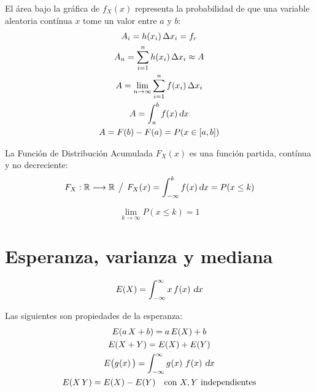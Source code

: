 El área bajo la gráfica de $f_X(x)$ representa la probabilidad de que una variable aleatoria contínua $x$ tome un valor entre $a$ y $b$:
\begin{gather*}
    A_i = h(x_i) \, \Delta x_i = f_r
    \\
    A_n = \sum_{i=1}^n h(x_i) \, \Delta x_i \approx A
    \\
    A = \lim_{n \to \infty} \sum_{i=1}^n f(x_i) \, \Delta x_i
    \\
    A = \int_a^b f(x) \, \dif x
    \\
    A = F(b) - F(a) = P(x \in [a,b])
\end{gather*}

La Función de Distribución Acumulada $F_X(x)$ es una función partida, contínua y no decreciente:
\begin{equation*}
    F_X: \setR \longrightarrow \setR \tq F_X(x) = \int_{-\infty}^k f(x) \, \dif x = P(x \leq k)
\end{equation*}

\begin{mdframed}[style=PropertyFrame]
    \begin{prop}
    \end{prop}
    \begin{equation*}
        \lim_{k \to \infty} P(x \leq k)=1
    \end{equation*}
\end{mdframed}


\section{Esperanza, varianza y mediana}

\begin{mdframed}[style=DefinitionFrame]
    \begin{defn}
    \end{defn}
    \begin{equation*}
        E(X) = \int_{-\infty}^{\infty} x \, \fx{x} \, \dif x
    \end{equation*}
\end{mdframed}

Las siguientes son propiedades de la esperanza:
\begin{gather*}
    E(a \, X + b) = a \, E(X) + b
    \\
    E(X+Y) = E(X) + E(Y)
    \\
    E \big( \fx[g]{x} \big) = \int_{-\infty}^{\infty} \fx[g]{x} \, \fx{x} \, \dif x
    \\
    E(X \, Y) = E(X) - E(Y) \quad \text{con $X,Y$ independientes}
\end{gather*}


